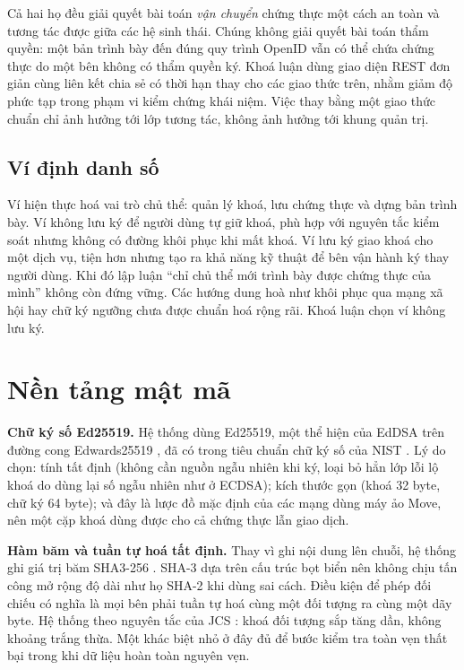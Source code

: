 Cả hai họ đều giải quyết bài toán \emph{vận chuyển} chứng thực một cách an toàn và tương tác được giữa các hệ sinh thái. Chúng không giải quyết bài toán thẩm quyền: một bản trình bày đến đúng quy trình OpenID vẫn có thể chứa chứng thực do một bên không có thẩm quyền ký. Khoá luận dùng giao diện REST đơn giản cùng liên kết chia sẻ có thời hạn thay cho các giao thức trên, nhằm giảm độ phức tạp trong phạm vi kiểm chứng khái niệm. Việc thay bằng một giao thức chuẩn chỉ ảnh hưởng tới lớp tương tác, không ảnh hưởng tới khung quản trị.

\subsection{Ví định danh số}

Ví hiện thực hoá vai trò chủ thể: quản lý khoá, lưu chứng thực và dựng bản trình bày. Ví không lưu ký để người dùng tự giữ khoá, phù hợp với nguyên tắc kiểm soát nhưng không có đường khôi phục khi mất khoá. Ví lưu ký giao khoá cho một dịch vụ, tiện hơn nhưng tạo ra khả năng kỹ thuật để bên vận hành ký thay người dùng. Khi đó lập luận ``chỉ chủ thể mới trình bày được chứng thực của mình'' không còn đứng vững. Các hướng dung hoà như khôi phục qua mạng xã hội hay chữ ký ngưỡng chưa được chuẩn hoá rộng rãi. Khoá luận chọn ví không lưu ký.

\section{Nền tảng mật mã}
\label{sec:mat-ma}

\textbf{Chữ ký số Ed25519.} Hệ thống dùng Ed25519, một thể hiện của EdDSA trên đường cong Edwards25519 \cite{RFC8032}, đã có trong tiêu chuẩn chữ ký số của NIST \cite{NIST_FIPS186_5}. Lý do chọn: tính tất định (không cần nguồn ngẫu nhiên khi ký, loại bỏ hẳn lớp lỗi lộ khoá do dùng lại số ngẫu nhiên như ở ECDSA); kích thước gọn (khoá 32 byte, chữ ký 64 byte); và đây là lược đồ mặc định của các mạng dùng máy ảo Move, nên một cặp khoá dùng được cho cả chứng thực lẫn giao dịch.

\textbf{Hàm băm và tuần tự hoá tất định.} Thay vì ghi nội dung lên chuỗi, hệ thống ghi giá trị băm SHA3-256 \cite{NIST_FIPS202}. SHA-3 dựa trên cấu trúc bọt biển nên không chịu tấn công mở rộng độ dài như họ SHA-2 khi dùng sai cách. Điều kiện để phép đối chiếu có nghĩa là mọi bên phải tuần tự hoá cùng một đối tượng ra cùng một dãy byte. Hệ thống theo nguyên tắc của JCS \cite{RFC8785}: khoá đối tượng sắp tăng dần, không khoảng trắng thừa. Một khác biệt nhỏ ở đây đủ để bước kiểm tra toàn vẹn thất bại trong khi dữ liệu hoàn toàn nguyên vẹn.

